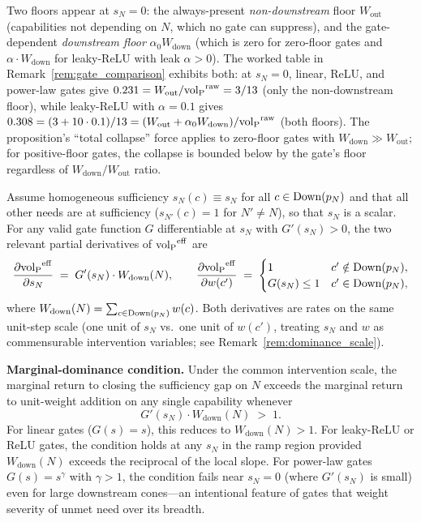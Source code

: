 \begin{remark}
\label{rem:nondownstream_floor}
Two floors appear at $s_N = 0$: the always-present
\emph{non-downstream} floor $W_{\mathrm{out}}$ (capabilities
not depending on $N$, which no gate can suppress), and the
gate-dependent \emph{downstream floor} $\alpha_0
W_{\mathrm{down}}$ (which is zero for zero-floor gates and
$\alpha \cdot W_{\mathrm{down}}$ for leaky-ReLU with leak
$\alpha > 0$).  The worked table in
Remark~\ref{rem:gate_comparison} exhibits both: at $s_N = 0$,
linear, ReLU, and power-law gates give $0.231 =
W_{\mathrm{out}}/{\operatorname{vol}_{\mathrm{P}}}^{\mathrm{raw}} = 3/13$ (only the
non-downstream floor), while leaky-ReLU with $\alpha = 0.1$
gives $0.308 = (3 + 10 \cdot 0.1)/13 = (W_{\mathrm{out}} +
\alpha_0 W_{\mathrm{down}})/{\operatorname{vol}_{\mathrm{P}}}^{\mathrm{raw}}$ (both floors).
The proposition's ``total collapse'' force applies to zero-floor
gates with $W_{\mathrm{down}} \gg W_{\mathrm{out}}$; for
positive-floor gates, the collapse is bounded below by the
gate's floor regardless of $W_{\mathrm{down}}/W_{\mathrm{out}}$
ratio.
\end{remark}

\begin{proposition}
\label{prop:need_dominance}
Assume homogeneous sufficiency $s_N(c) \equiv s_N$ for all $c \in
\mathrm{Down}(p_N)$ and that all other needs are at sufficiency
($s_{N'}(c) = 1$ for $N' \neq N$), so that $s_N$ is a scalar.
For any valid gate function $G$ differentiable at $s_N$ with
$G'(s_N) > 0$, the two relevant partial derivatives of
${\operatorname{vol}_{\mathrm{P}}}^{\mathrm{eff}}$ are
\[
  \frac{\partial {\operatorname{vol}_{\mathrm{P}}}^{\mathrm{eff}}}{\partial s_N}
  \;=\; G'(s_N) \cdot W_{\mathrm{down}}(N),
  \qquad
  \frac{\partial {\operatorname{vol}_{\mathrm{P}}}^{\mathrm{eff}}}{\partial w(c')}
  \;=\;
  \begin{cases}
    1 & c' \notin \mathrm{Down}(p_N), \\
    G(s_N) \leq 1 & c' \in \mathrm{Down}(p_N),
  \end{cases}
\]
where $W_{\mathrm{down}}(N) = \sum_{c \in \mathrm{Down}(p_N)} w(c)$.
Both derivatives are rates on the same unit-step scale
(one unit of $s_N$ vs.\ one unit of $w(c')$, treating $s_N$ and
$w$ as commensurable intervention variables; see
Remark~\ref{rem:dominance_scale}).

\medskip\noindent
\textbf{Marginal-dominance condition.}  Under the common
intervention scale, the marginal return to closing the
sufficiency gap on $N$ exceeds the marginal return to unit-weight
addition on any single capability whenever
\[
  G'(s_N) \cdot W_{\mathrm{down}}(N) \;>\; 1.
\]
For linear gates ($G(s) = s$), this reduces to
$W_{\mathrm{down}}(N) > 1$.  For leaky-ReLU or ReLU gates, the
condition holds at any $s_N$ in the ramp region provided
$W_{\mathrm{down}}(N)$ exceeds the reciprocal of the local
slope.  For power-law gates $G(s) = s^\gamma$ with $\gamma > 1$,
the condition fails near $s_N = 0$ (where $G'(s_N)$ is small)
even for large downstream cones---an intentional feature of
gates that weight severity of unmet need over its breadth.
\end{proposition}

